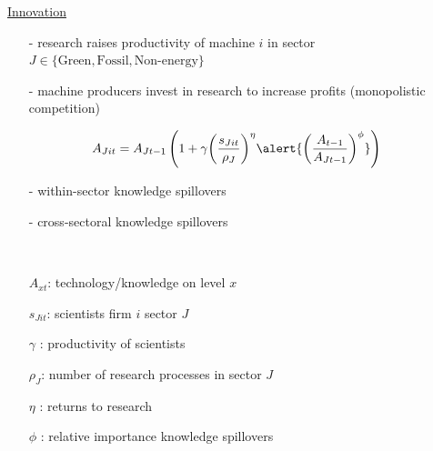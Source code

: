 \documentclass[11pt,aspectratio=169]{beamer}
\begin{document}
\addtocounter{framenumber}{-1}
\begin{frame}{\hyperlink{modma}{Innovation}}
	\vspace{-2mm}
	\begin{itemize}
		\item[-] research raises productivity of machine $i$ in sector $J\in\{\text{Green},\text{Fossil},\text{Non-energy}\}$ \vspace{-1mm}
		\item[-] machine producers invest in research to increase profits \small{(monopolistic competition)}
		\vspace{-1mm}
		\normalsize
	\end{itemize}
	\vspace{-1.4mm}
	\large
	\begin{align*}
		A_{Jit}={A_{Jt-1}}\left(1+\gamma{\left(\frac{s_{Jit}}{\rho_J}\right)^{\eta}}\alert{\left(\frac{A_{t-1}}{A_{Jt-1}}\right)^\phi}\right)
	\end{align*}
	\normalsize
	\vspace{-1.9mm}
	\begin{enumerate}
		\item[-] within-sector knowledge spillovers \vspace{-1mm}
		\item[-]  \alert{cross-sectoral knowledge spillovers} \vspace{-1mm}%
		\item[] \
	\end{enumerate}
	\small
\vspace{4mm}
\hspace{-2mm}
\begin{minipage}[t!]{0.46\textwidth}
	\vspace{0mm}
	\begin{itemize}
		\item[] $A_{xt}$: technology/knowledge on level $x$
		\vspace{-7mm}		
		\item[] $s_{Jit}$: scientists firm $i$ sector $J$
		\vspace{-2mm}
		\item[] $\gamma$ : productivity of scientists
	\end{itemize}
\end{minipage}
\hspace{-5mm}
\vspace{-5mm}
\begin{minipage}[t!]{0.54\textwidth}
	\vspace{0mm}
	\begin{itemize}	
		\item[] {$\rho_J$: number of research processes in sector $J$}
		\vspace{-2mm}			
		\item[] $\eta$ : returns to research
		\vspace{-2mm}			
		\item[] $\phi$ : relative importance knowledge spillovers
	\end{itemize}
\end{minipage}\end{frame}
\end{document}
